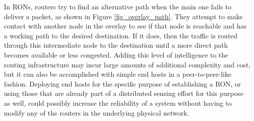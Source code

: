 \documentclass[conference]{IEEEtran}
\begin{document}

In RONs, routers try to find an alternative path when the main one fails to deliver a packet, as shown in Figure \ref{fig_overlay_path}.
They attempt to make contact with another node in the overlay to see if that node is reachable and has a working path to the desired destination.
If it does, then the traffic is routed through this intermediate node to the destination until a more direct path becomes available or less congested.
Adding this level of intelligence to the routing infrastructure may incur large amounts of additional complexity and cost, but it can also be accomplished with simple end hosts in a peer-to-peer-like fashion.
Deploying end hosts for the specific purpose of establishing a RON, or using those that are already part of a distributed sensing effort for this purpose as well, could possibly increase the reliability of a system without having to modify any of the routers in the underlying physical network.



% 
% 
\end{document}
